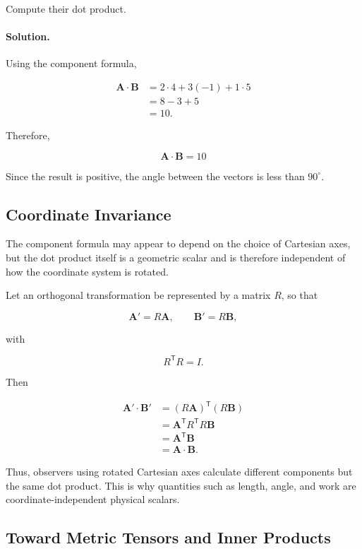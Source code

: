 Compute their dot product.

\paragraph{Solution.}
Using the component formula,

\begin{align*}
\mathbf A\cdot\mathbf B
&=2\cdot4+3(-1)+1\cdot5\\
&=8-3+5\\
&=10.
\end{align*}

Therefore,

\[
\boxed{
\mathbf A\cdot\mathbf B=10
}
\]

Since the result is positive, the angle between the vectors is less than
$90^{\circ}$.

\subsection{Coordinate Invariance}

The component formula may appear to depend on the choice of Cartesian axes, but
the dot product itself is a geometric scalar and is therefore independent of
how the coordinate system is rotated.

Let an orthogonal transformation be represented by a matrix $R$, so that

\[
\mathbf A'=R\mathbf A,
\qquad
\mathbf B'=R\mathbf B,
\]

with

\[
R^{\mathsf T}R=I.
\]

Then

\begin{align*}
\mathbf A'\cdot\mathbf B'
&=(R\mathbf A)^{\mathsf T}(R\mathbf B)\\
&=\mathbf A^{\mathsf T}R^{\mathsf T}R\mathbf B\\
&=\mathbf A^{\mathsf T}\mathbf B\\
&=\mathbf A\cdot\mathbf B.
\end{align*}

Thus, observers using rotated Cartesian axes calculate different components but
the same dot product. This is why quantities such as length, angle, and work are
coordinate-independent physical scalars.

\subsection{Toward Metric Tensors and Inner Products}


